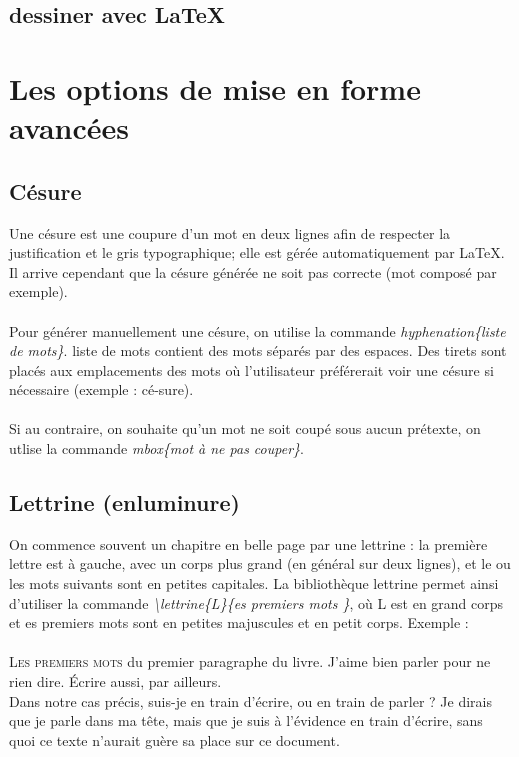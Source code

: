\documentclass[a4paper, 10pt]{book}
\begin{document}
\listoffigures

\section{dessiner avec LaTeX}

\chapter{Les options de mise en forme avancées}
\section{Césure}
Une césure est une coupure d'un mot en deux lignes afin de respecter la justification et le gris typographique; elle est gérée automatiquement par \LaTeX. Il arrive cependant que la césure générée ne soit pas correcte (mot composé par exemple). \\\\
Pour générer manuellement une césure, on utilise la commande \textit{hyphenation\{liste de mots\}}. \textsf{liste de mots} contient des mots séparés par des espaces. Des tirets sont placés aux emplacements des mots où l'utilisateur préférerait voir une césure si nécessaire (exemple : cé-sure).\\ \\
Si au contraire, on souhaite qu'un mot ne soit coupé sous aucun prétexte, on utlise la commande \textit{mbox\{mot à ne pas couper\}}.

\section{Lettrine (enluminure)}

On commence souvent un chapitre en belle page par une lettrine : la première lettre est à gauche, avec un corps plus grand (en général sur deux lignes), et le ou les mots suivants sont en petites capitales. La bibliothèque \textsf{lettrine} permet ainsi d'utiliser la commande \textit{\textbackslash lettrine\{L\}\{es premiers mots \}}, où \textsf{L} est en grand corps et \textsf{es premiers mots} sont en petites majuscules et en petit corps. Exemple : \\ \\
\lettrine{L}{es premiers mots} du premier paragraphe du livre. J'aime bien parler pour ne rien dire. \'Ecrire aussi, par ailleurs. \\Dans notre cas précis, suis-je en train d'écrire, ou en train de parler ? Je dirais que je parle dans ma tête, mais que je suis à l'évidence en train d'écrire, sans quoi ce texte n'aurait guère sa place sur ce document.\\ 
\end{document}
